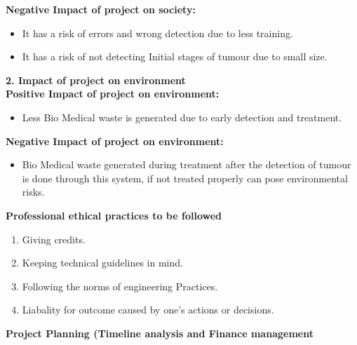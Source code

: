 {\textbf{Negative Impact of project on society:}}
\begin{itemize}
    \item It has a risk of errors and wrong detection due to less training.
    \item It has a risk of not detecting Initial stages of tumour due to small size.
\end{itemize}
{\textbf{2. Impact of project on environment }\\
{\textbf{Positive Impact of project on environment: }}
\begin{itemize}
    \item  Less Bio Medical waste is generated due to early detection and treatment.
\end{itemize}
{\textbf{Negative Impact of project on environment: }}
\begin{itemize}
    \item Bio Medical waste generated during treatment after the detection of tumour is done through this system, if not treated properly can pose environmental risks.
\end{itemize}
{\bf \Large Professional ethical practices to be followed}
\begin{enumerate}
\item Giving credits.
\item Keeping technical guidelines in mind.
\item Following the norms of engineering Practices.
\item Liabality for outcome caused by one's actions or decisions.
\end{enumerate}
{\bf \Large Project Planning (Timeline analysis and Finance management}\\

}
